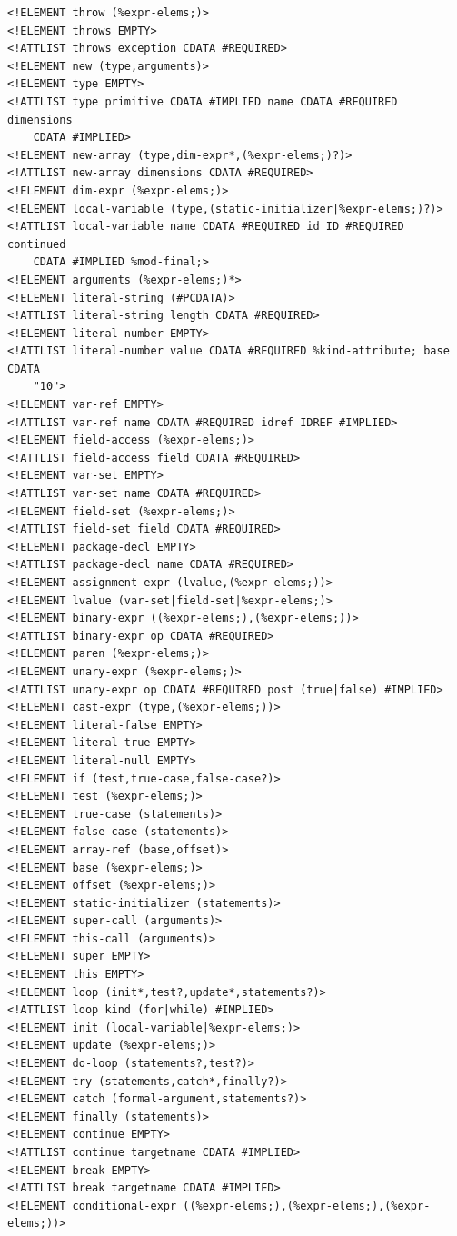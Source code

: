 \documentclass{article}
\begin{document}
\begin{verbatim}
<!ELEMENT throw (%expr-elems;)>
<!ELEMENT throws EMPTY>
<!ATTLIST throws exception CDATA #REQUIRED>
<!ELEMENT new (type,arguments)>
<!ELEMENT type EMPTY>
<!ATTLIST type primitive CDATA #IMPLIED name CDATA #REQUIRED dimensions
    CDATA #IMPLIED>
<!ELEMENT new-array (type,dim-expr*,(%expr-elems;)?)>
<!ATTLIST new-array dimensions CDATA #REQUIRED>
<!ELEMENT dim-expr (%expr-elems;)>
<!ELEMENT local-variable (type,(static-initializer|%expr-elems;)?)>
<!ATTLIST local-variable name CDATA #REQUIRED id ID #REQUIRED continued
    CDATA #IMPLIED %mod-final;>
<!ELEMENT arguments (%expr-elems;)*>
<!ELEMENT literal-string (#PCDATA)>
<!ATTLIST literal-string length CDATA #REQUIRED>
<!ELEMENT literal-number EMPTY>
<!ATTLIST literal-number value CDATA #REQUIRED %kind-attribute; base CDATA
    "10">
<!ELEMENT var-ref EMPTY>
<!ATTLIST var-ref name CDATA #REQUIRED idref IDREF #IMPLIED>
<!ELEMENT field-access (%expr-elems;)>
<!ATTLIST field-access field CDATA #REQUIRED>
<!ELEMENT var-set EMPTY>
<!ATTLIST var-set name CDATA #REQUIRED>
<!ELEMENT field-set (%expr-elems;)>
<!ATTLIST field-set field CDATA #REQUIRED>
<!ELEMENT package-decl EMPTY>
<!ATTLIST package-decl name CDATA #REQUIRED>
<!ELEMENT assignment-expr (lvalue,(%expr-elems;))>
<!ELEMENT lvalue (var-set|field-set|%expr-elems;)>
<!ELEMENT binary-expr ((%expr-elems;),(%expr-elems;))>
<!ATTLIST binary-expr op CDATA #REQUIRED>
<!ELEMENT paren (%expr-elems;)>
<!ELEMENT unary-expr (%expr-elems;)>
<!ATTLIST unary-expr op CDATA #REQUIRED post (true|false) #IMPLIED>
<!ELEMENT cast-expr (type,(%expr-elems;))>
<!ELEMENT literal-false EMPTY>
<!ELEMENT literal-true EMPTY>
<!ELEMENT literal-null EMPTY>
<!ELEMENT if (test,true-case,false-case?)>
<!ELEMENT test (%expr-elems;)>
<!ELEMENT true-case (statements)>
<!ELEMENT false-case (statements)>
<!ELEMENT array-ref (base,offset)>
<!ELEMENT base (%expr-elems;)>
<!ELEMENT offset (%expr-elems;)>
<!ELEMENT static-initializer (statements)>
<!ELEMENT super-call (arguments)>
<!ELEMENT this-call (arguments)>
<!ELEMENT super EMPTY>
<!ELEMENT this EMPTY>
<!ELEMENT loop (init*,test?,update*,statements?)>
<!ATTLIST loop kind (for|while) #IMPLIED>
<!ELEMENT init (local-variable|%expr-elems;)>
<!ELEMENT update (%expr-elems;)>
<!ELEMENT do-loop (statements?,test?)>
<!ELEMENT try (statements,catch*,finally?)>
<!ELEMENT catch (formal-argument,statements?)>
<!ELEMENT finally (statements)>
<!ELEMENT continue EMPTY>
<!ATTLIST continue targetname CDATA #IMPLIED>
<!ELEMENT break EMPTY>
<!ATTLIST break targetname CDATA #IMPLIED>
<!ELEMENT conditional-expr ((%expr-elems;),(%expr-elems;),(%expr-elems;))>
\end{verbatim}
\end{document}
